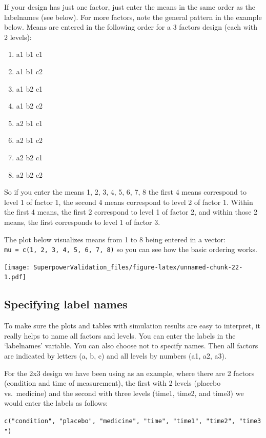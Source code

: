\documentclass[
]{book}
\providecommand{\tightlist}{%
  \setlength{\itemsep}{0pt}\setlength{\parskip}{0pt}}
\begin{document}
If your design has just one factor, just enter the means in the same order as the labelnames (see below). For more factors, note the general pattern in the example below. Means are entered in the following order for a 3 factors design (each with 2 levels):

\begin{enumerate}
\def\labelenumi{\arabic{enumi}.}
\tightlist
\item
  a1 b1 c1
\item
  a1 b1 c2
\item
  a1 b2 c1
\item
  a1 b2 c2
\item
  a2 b1 c1
\item
  a2 b1 c2
\item
  a2 b2 c1
\item
  a2 b2 c2
\end{enumerate}

So if you enter the means 1, 2, 3, 4, 5, 6, 7, 8 the first 4 means correspond to level 1 of factor 1, the second 4 means correspond to level 2 of factor 1. Within the first 4 means, the first 2 correspond to level 1 of factor 2, and within those 2 means, the first corresponds to level 1 of factor 3.

The plot below visualizes means from 1 to 8 being entered in a vector: \texttt{mu\ =\ c(1,\ 2,\ 3,\ 4,\ 5,\ 6,\ 7,\ 8)} so you can see how the basic ordering works.

\texttt{[image: SuperpowerValidation\_files/figure-latex/unnamed-chunk-22-1.pdf]}

\hypertarget{specifying-label-names}{%
\subsection{Specifying label names}\label{specifying-label-names}}

To make sure the plots and tables with simulation results are easy to interpret, it really helps to name all factors and levels. You can enter the labels in the `labelnames' variable. You can also choose not to specify names. Then all factors are indicated by letters (a, b, c) and all levels by numbers (a1, a2, a3).

For the 2x3 design we have been using as an example, where there are 2 factors (condition and time of measurement), the first with 2 levels (placebo vs.~medicine) and the second with three levels (time1, time2, and time3) we would enter the labels as follows:

\texttt{c("condition",\ "placebo",\ "medicine",\ "time",\ "time1",\ "time2",\ "time3")}
\end{document}

